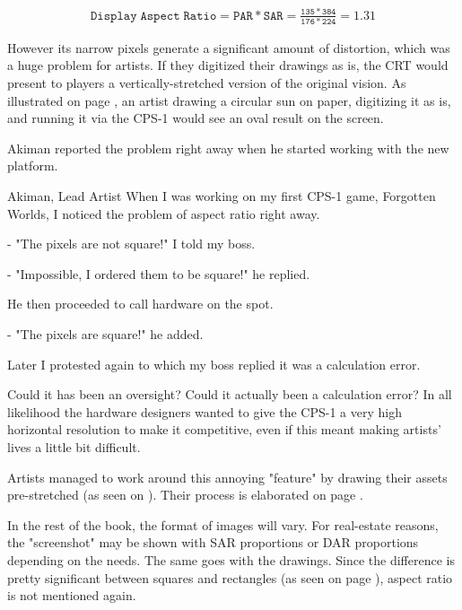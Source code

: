 \begin{align*}
 \mathtt{Display\;Aspect\;Ratio = PAR * SAR = \frac{135*384}{176*224} = 1.31}
\end{align*}

However its narrow pixels generate a significant amount of distortion, which was a huge problem for artists. If they digitized their drawings as is, the CRT would present to players a vertically-stretched version of the original vision. As illustrated on page \pageref{sf2_ratio}, an artist drawing a circular sun on paper, digitizing it as is, and running it via the CPS-1 would see an oval result on the screen.

Akiman reported the problem right away when he started working with the new platform.

\begin{q}{Akiman, Lead Artist\cite{akiman}}
When I was working on my first CPS-1 game, Forgotten Worlds, I noticed the problem of aspect ratio right away. 

- "The pixels are not square!" I told my boss.

- "Impossible, I ordered them to be square!" he replied.

He then proceeded to call hardware on the spot.

- "The pixels are square!" he added.

Later I protested again to which my boss replied it was a calculation error.
\end{q}

Could it has been an oversight? Could it actually been a calculation error? In all likelihood the hardware designers wanted to give the CPS-1 a very high horizontal resolution to make it competitive, even if this meant making artists' lives a little bit difficult.

Artists managed to work around this annoying "feature" by drawing their assets pre-stretched (as seen on \pageref{sf2_ratio_solution}). Their process is elaborated on page \pageref{artists_par}.
 
In the rest of the book, the format of images will vary. For real-estate reasons, the "screenshot" may be shown with SAR proportions or DAR proportions depending on the needs. The same goes with the drawings. Since the difference is pretty significant between squares and rectangles (as seen on page \pageref{sf2_ratio_solution}), aspect ratio is not mentioned again.

\pagebreak

\label{sf2_ratio}
\vfill
{}

